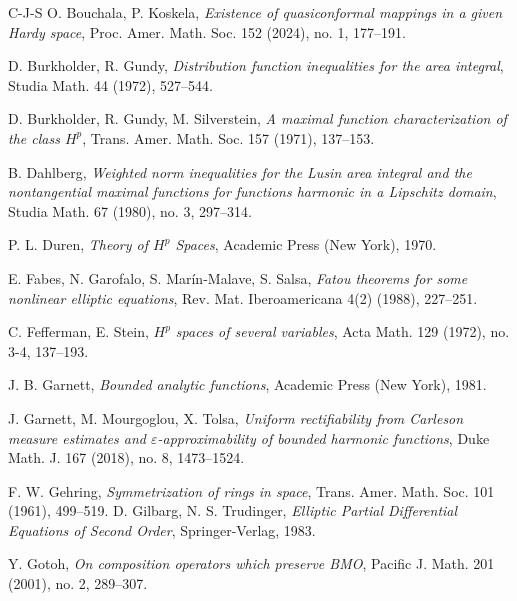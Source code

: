 \documentclass[11pt,a4paper,reqno]{amsart}
\theoremstyle{definition}
\numberwithin{komcounter}{section}
\begin{document}
\begin{thebibliography}{C-J-S}
 O. Bouchala, P. Koskela, \emph{Existence of quasiconformal mappings in a given Hardy space}, Proc. Amer. Math. Soc. 152 (2024), no. 1, 177--191.

 D. Burkholder, R. Gundy, \emph{Distribution function inequalities for the area integral}, Studia Math. 44 (1972), 527--544.

 D. Burkholder, R. Gundy, M. Silverstein, \emph{A maximal function characterization of the class $H^p$}, Trans. Amer. Math. Soc. 157 (1971), 137--153.

 B. Dahlberg, \emph{Weighted norm inequalities for the Lusin area integral and the nontangential maximal functions for functions harmonic in a Lipschitz domain}, Studia Math. 67 (1980), no. 3, 297--314.

 P. L. Duren, \textit {Theory of $H^p$ Spaces}, Academic Press (New York), 1970.


 E. Fabes, N. Garofalo, S. Mar\'in-Malave, S. Salsa, \emph{Fatou theorems for some nonlinear elliptic equations}, Rev. Mat. Iberoamericana 4(2) (1988), 227--251.


 C. Fefferman, E. Stein, \emph{$H^p$ spaces of several variables}, Acta Math. 129 (1972), no. 3-4, 137--193.

 J. B. Garnett,  \textit{Bounded analytic functions}, Academic Press (New York), 1981.

 J. Garnett, M. Mourgoglou, X. Tolsa, \emph{Uniform rectifiability from Carleson measure estimates and $\varepsilon$-approximability of bounded harmonic functions}, Duke Math. J. 167 (2018), no. 8, 1473--1524.


 F. W. Gehring, \emph{Symmetrization of rings in space}, Trans. Amer. Math. Soc. 101 (1961), 499--519.
 D. Gilbarg, N. S. Trudinger, \emph{Elliptic Partial Differential Equations of Second Order}, Springer-Verlag, 1983.

 Y. Gotoh, \emph{On composition operators which preserve BMO}, Pacific J. Math. 201 (2001), no. 2, 289--307.


\end{thebibliography}
\end{document}
